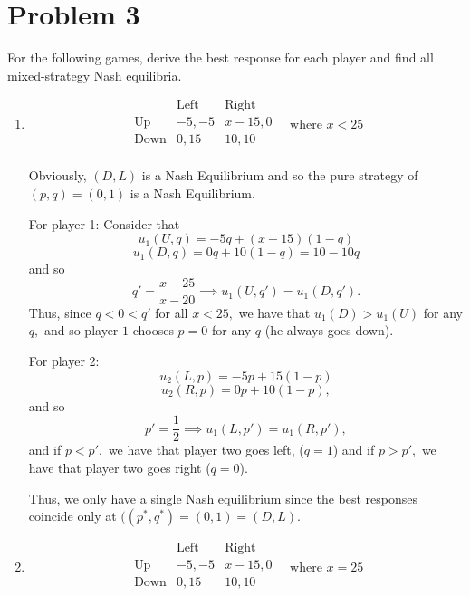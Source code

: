 \documentclass[11pt]{article}
\begin{document}
\section*{Problem 3}
\begin{problem}
For the following games, derive the best response for each player and find all mixed-strategy Nash equilibria.
    \begin{enumerate}
        \item 
        

\[
        \begin{array}{c|cc}
            & \text{Left} & \text{Right} \\
            \hline
            \text{Up} & -5, -5 & x - 15, 0 \\
            \text{Down} & 0, 15 & 10, 10 \\
        \end{array}
        \quad \text{where } x < 25
        \]
\begin{solution}
    Obviously, $(D,L)$ is a Nash Equilibrium and so the pure strategy of $(p, q) = (0,1)$ is a Nash Equilibrium. 
    
    For player 1: Consider that 
    \[u_1(U, q) = -5q + (x-15)(1-q)\]
    \[u_1(D,q) = 0q + 10(1-q) = 10 - 10q\] and so 
    \[q' = \frac{x- 25}{x-20} \implies u_1(U, q')= u_1(D, q').\] Thus, since $q <0<q'$ for all $x<25,$ we have that $u_1(D) > u_1(U)$ for any $q,$ and so player $1$ chooses $p = 0$ for any $q$ (he always goes down). 

    For player 2:
    \[u_2(L, p) = -5p + 15(1-p)\]
    \[u_2(R, p) = 0p + 10(1-p),\]
    and so 
    \[p' = \frac{1}{2} \implies u_1(L, p')= u_1(R, p'),\] and if $p< p',$ we have that player two goes left, ($q = 1$) and if $p>p',$ we have that player two goes right ($q = 0$). 

    Thus, we only have a single Nash equilibrium since the best responses coincide only at $((p^*, q^*) = (0,1) = (D,L).$
\end{solution}

        \item 
        

\[
        \begin{array}{c|cc}
            & \text{Left} & \text{Right} \\
            \hline
            \text{Up} & -5, -5 & x - 15, 0 \\
            \text{Down} & 0, 15 & 10, 10 \\
        \end{array}
        \quad \text{where } x = 25
        \]



\end{enumerate}
\end{problem}
\end{document}
